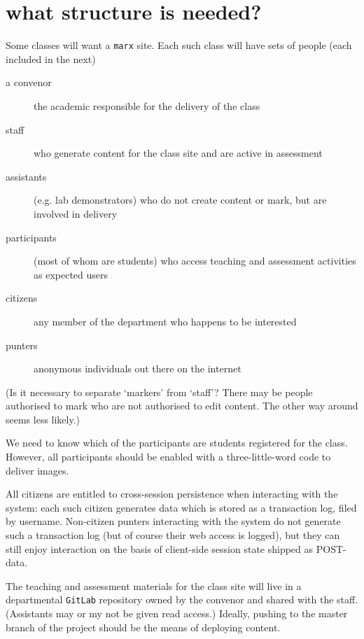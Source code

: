 \documentclass{article}
\begin{document}
\section{what structure is needed?}

Some classes will want a {\tt marx} site. Each such class will have sets of people (each included in the next)
\begin{description}
\item[a convenor] the academic responsible for the delivery of the class
\item[staff] who generate content for the class site and are active in assessment
\item[assistants] (e.g. lab demonstrators) who do not create content or mark, but are involved in delivery
\item[participants] (most of whom are students) who access teaching and assessment activities as expected users
\item[citizens] any member of the department who happens to be interested
\item[punters] anonymous individuals out there on the internet
\end{description}

(Is it necessary to separate `markers' from `staff'? There may be people authorised to mark who are not authorised to edit content. The other way around seems less likely.)

We need to know which of the participants are students registered for the class. However, all participants
should be enabled with a three-little-word code to deliver images.

All citizens are entitled to cross-session persistence when interacting with the system: each such citizen generates data which is stored as a transaction log, filed by username. Non-citizen punters interacting with the system do not generate such a transaction log (but of course their web access is logged), but they can still enjoy interaction on the basis of client-side session state shipped as POST-data.

The teaching and assessment materials for the class site will live in a departmental {\tt GitLab} repository owned by the convenor and shared with the staff. (Assistants may or my not be given read access.) Ideally, pushing to the master branch of the project should be the means of deploying content.
\end{document}

